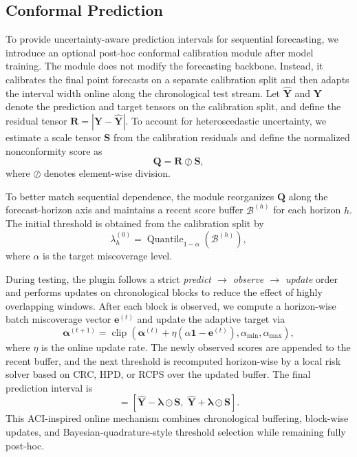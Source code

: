 \subsection{Conformal Prediction}

To provide uncertainty-aware prediction intervals for sequential forecasting, we introduce an optional post-hoc conformal calibration module after model training. The module does not modify the forecasting backbone. Instead, it calibrates the final point forecasts on a separate calibration split and then adapts the interval width online along the chronological test stream. Let $\hat{\mathbf{Y}}$ and $\mathbf{Y}$ denote the prediction and target tensors on the calibration split, and define the residual tensor $\mathbf{R}=|\mathbf{Y}-\hat{\mathbf{Y}}|$. To account for heteroscedastic uncertainty, we estimate a scale tensor $\mathbf{S}$ from the calibration residuals and define the normalized nonconformity score as
\begin{equation}
\mathbf{Q} = \mathbf{R} \oslash \mathbf{S},
\end{equation}
where $\oslash$ denotes element-wise division.

To better match sequential dependence, the module reorganizes $\mathbf{Q}$ along the forecast-horizon axis and maintains a recent score buffer $\mathcal{B}^{(h)}$ for each horizon $h$. The initial threshold is obtained from the calibration split by
\begin{equation}
\lambda_h^{(0)} = \operatorname{Quantile}_{1-\alpha}\!\left(\mathcal{B}^{(h)}\right),
\end{equation}
where $\alpha$ is the target miscoverage level.

During testing, the plugin follows a strict \textit{predict $\rightarrow$ observe $\rightarrow$ update} order and performs updates on chronological blocks to reduce the effect of highly overlapping windows. After each block is observed, we compute a horizon-wise batch miscoverage vector $\mathbf{e}^{(t)}$ and update the adaptive target via
\begin{equation}
\boldsymbol{\alpha}^{(t+1)} =
\operatorname{clip}\!\left(
\boldsymbol{\alpha}^{(t)} + \eta \left(\alpha \mathbf{1} - \mathbf{e}^{(t)}\right),
\alpha_{\min}, \alpha_{\max}
\right),
\end{equation}
where $\eta$ is the online update rate. The newly observed scores are appended to the recent buffer, and the next threshold is recomputed horizon-wise by a local risk solver based on CRC, HPD, or RCPS over the updated buffer. The final prediction interval is
\begin{equation}
[\hat{\mathbf{Y}}^{\text{lower}}, \hat{\mathbf{Y}}^{\text{upper}}]
=
\left[
\hat{\mathbf{Y}} - \boldsymbol{\lambda}\odot\mathbf{S},\;
\hat{\mathbf{Y}} + \boldsymbol{\lambda}\odot\mathbf{S}
\right].
\end{equation}
This ACI-inspired online mechanism combines chronological buffering, block-wise updates, and Bayesian-quadrature-style threshold selection while remaining fully post-hoc.
